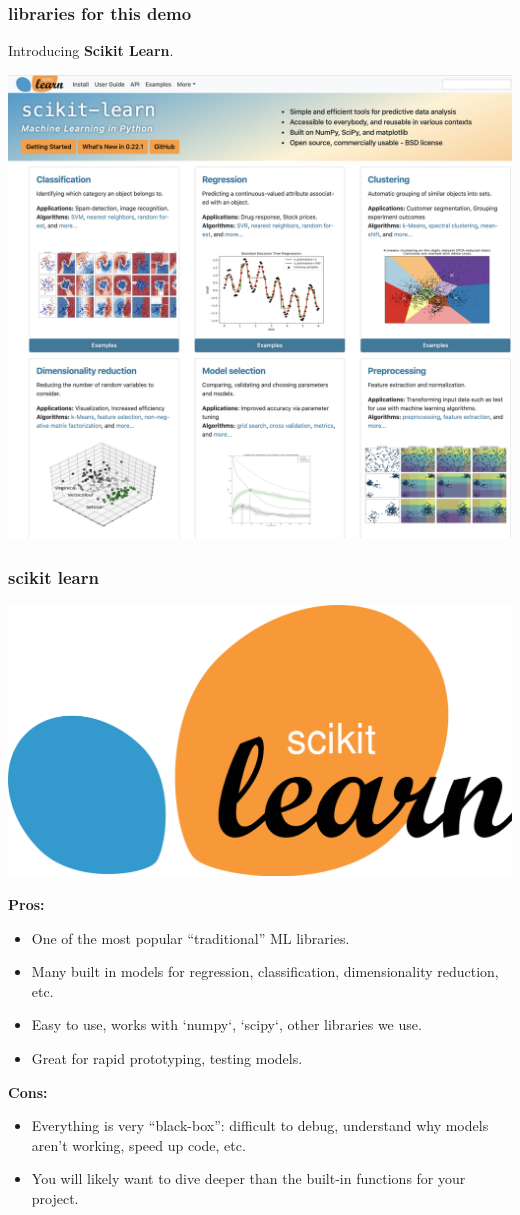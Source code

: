 \documentclass[handout,compress]{beamer}
\begin{document}
\begin{frame}
	\frametitle{libraries for this demo}
	\begin{center}
		Introducing \textbf{Scikit Learn}.
		
		\includegraphics[width=.7\textwidth]{sklearn_web.png}
	\end{center}
\end{frame}

\begin{frame}
	\frametitle{scikit learn}
	\small
	\begin{center}
		\includegraphics[width=.2\textwidth]{sklearn.png}
	\end{center}
\vspace{-1.5em}
			
	\textbf{Pros:}
	\begin{itemize}
		\item One of the most popular ``traditional'' ML libraries.
		\item Many built in models for regression, classification, dimensionality reduction, etc. 
		\item Easy to use, works with `numpy`, `scipy`, other libraries we use.
		\item Great for rapid prototyping, testing models.
	\end{itemize}
	
	\vspace{-.5em}
	\textbf{Cons:}
	\begin{itemize}
		\item Everything is very ``black-box'': difficult to debug, understand why models aren't working, speed up code, etc.
		\item You will likely want to dive deeper than the built-in functions for your project. 
	\end{itemize}
\end{frame}
\end{document}
